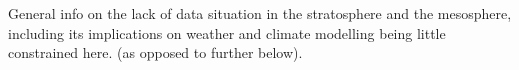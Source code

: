 General info on the lack of data situation in the stratosphere and the mesosphere, including its implications on weather and climate modelling being little constrained here. (as opposed to further below).